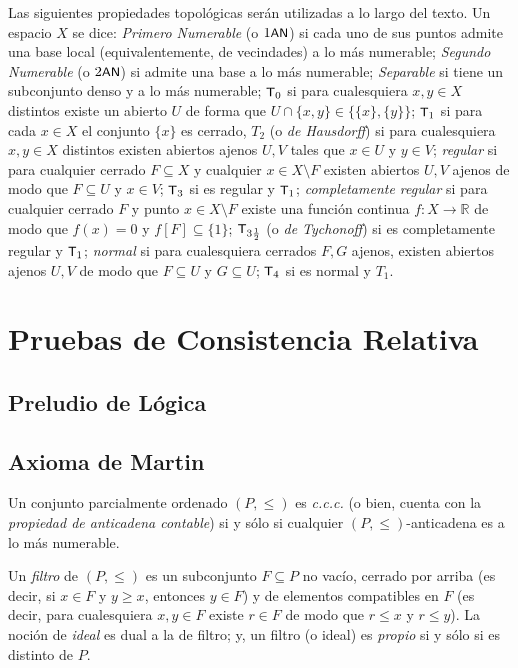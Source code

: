     Las siguientes propiedades topológicas serán utilizadas a lo largo del texto. Un espacio $X$ se dice: \textit{Primero Numerable} (o $1\text{\textsf{\small AN}}$) si cada uno de sus puntos admite una base local (equivalentemente, de vecindades) a lo más numerable; \textit{Segundo Numerable} (o $2\text{\textsf{\small AN}}$) si admite una base a lo más numerable; \textit{Separable} si tiene un subconjunto denso y a lo más numerable; $\text{\textsf{\small T}}_0$ si para cualesquiera $x,y \in X$ distintos existe un abierto $U$ de forma que $U \cap \{x,y\} \in \{\{x\},\{y\}\}$; $\text{\textsf{\small T}}_1$ si para cada $x \in X$ el conjunto $\{x\}$ es cerrado, $T_2$ (o \textit{de Hausdorff}) si para cualesquiera $x,y \in X$ distintos existen abiertos ajenos $U,V$ tales que $x \in U$ y $y \in V$; \textit{regular} si para cualquier cerrado $F \subseteq X$ y cualquier $x \in X \setminus F$ existen abiertos $U,V$ ajenos de modo que $F \subseteq U$ y $x \in V$; $\text{\textsf{\small T}}_3$ si es regular y $\text{\textsf{\small T}}_1$; \textit{completamente regular} si para cualquier cerrado $F$ y punto $x \in X \setminus F$ existe una función continua $f:X \to \mathbb{R}$ de modo que $f(x)=0$ y $f[F] \subseteq \{1\}$; $\text{\textsf{\small T}}_{3 \frac{1}{2}}$ (o \textit{de Tychonoff}) si es completamente regular y $\text{\textsf{\small T}}_1$; \textit{normal} si para cualesquiera cerrados $F,G$ ajenos, existen abiertos ajenos $U,V$ de modo que $F \subseteq U$ y $G \subseteq U$; $\text{\textsf{\small T}}_4$ si es normal y $T_1$.
    












    \newpage
    \section{Pruebas de Consistencia Relativa}
    \subsection{Preludio de Lógica}
    \subsection{Axioma de Martin}

    Un conjunto parcialmente ordenado $(P,\leq)$ es \textit{c.c.c.} (o bien, cuenta con la \textit{propiedad de anticadena contable}) si y sólo si cualquier $(P,\leq)$-anticadena es a lo más numerable.

    Un \textit{filtro} de $(P,\leq)$ es un subconjunto $F \subseteq P$ no vacío, cerrado por arriba (es decir, si $x \in F$ y $y \geq x$, entonces $y \in F$) y de elementos compatibles en $F$ (es decir, para cualesquiera $x,y \in F$ existe $r \in F$ de modo que $r \leq x$ y $r \leq y$). La noción de \textit{ideal} es dual a la de filtro; y, un filtro (o ideal) es \textit{propio} si y sólo si es distinto de $P$.

